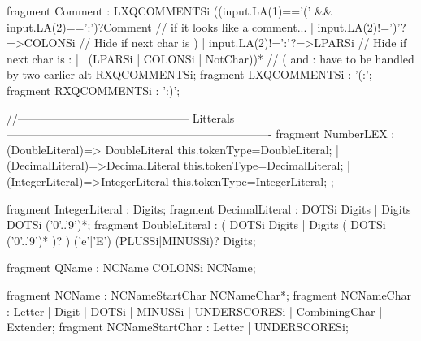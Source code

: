 fragment Comment           : LXQCOMMENTSi 
                ({(input.LA(1)=='(' && input.LA(2)==':')}?Comment     // if it looks like a comment...
                | {input.LA(2)!=')'}?=>COLONSi              // Hide if next char is )
                | {input.LA(2)!=':'}?=>LPARSi               // Hide if next char is :
                | ~(LPARSi | COLONSi | NotChar))*             // ( and : have to be handled by two earlier alt
                  RXQCOMMENTSi;
  fragment LXQCOMMENTSi    : '(:';
  fragment RXQCOMMENTSi    : ':)';



//--------------------------------------------- Litterals ----------------------------------------------------------------------
fragment NumberLEX          : (DoubleLiteral)=>  DoubleLiteral        {this.tokenType=DoubleLiteral;}
                    | (DecimalLiteral)=>DecimalLiteral        {this.tokenType=DecimalLiteral;}
                  | (IntegerLiteral)=>IntegerLiteral        {this.tokenType=IntegerLiteral;}
                  ;
                  
fragment IntegerLiteral        : Digits;
fragment DecimalLiteral        : DOTSi Digits 
                  | Digits DOTSi ('0'..'9')*;
fragment DoubleLiteral        : (
                    DOTSi Digits 
                    | Digits ( DOTSi ('0'..'9')* )?
                    ) 
                    ('e'|'E') (PLUSSi|MINUSSi)? Digits;

fragment QName            : NCName COLONSi NCName;

fragment NCName                    : NCNameStartChar NCNameChar*;
  fragment NCNameChar               : Letter | Digit | DOTSi | MINUSSi | UNDERSCORESi | CombiningChar | Extender;
  fragment NCNameStartChar           : Letter | UNDERSCORESi;


